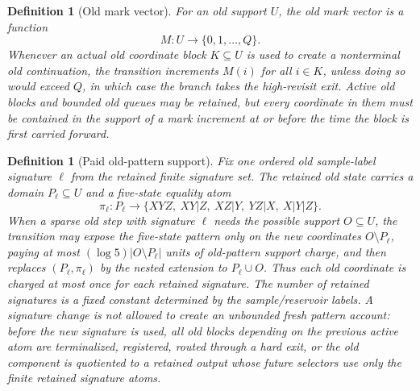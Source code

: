 \documentclass[11pt]{article}
\newtheorem{definition}[theorem]{Definition}
\theoremstyle{remark}
\begin{document}
\begin{definition}[Old mark vector]
For an old support $U$, the old mark vector is a function
\[
        M:U\to\{0,1,\ldots,Q\}.
\]
Whenever an actual old coordinate block $K\subseteq U$ is used to create a nonterminal old continuation, the transition increments $M(i)$ for all $i\in K$, unless doing so would exceed $Q$, in which case the branch takes the high-revisit exit.  Active old blocks and bounded old queues may be retained, but every coordinate in them must be contained in the support of a mark increment at or before the time the block is first carried forward.
\end{definition}

\begin{definition}[Paid old-pattern support]\label{def:paid-old-pattern}
Fix one ordered old sample-label signature $\ell$ from the retained finite signature set.  The retained old state carries a domain $P_\ell\subseteq U$ and a five-state equality atom
\[
        \pi_\ell:P_\ell\to
        \{XYZ,\ XY|Z,\ XZ|Y,\ YZ|X,\ X|Y|Z\}.
\]
When a sparse old step with signature $\ell$ needs the possible support $O\subseteq U$, the transition may expose the five-state pattern only on the new coordinates $O\setminus P_\ell$, paying at most $(\log 5)|O\setminus P_\ell|$ units of old-pattern support charge, and then replaces $(P_\ell,\pi_\ell)$ by the nested extension to $P_\ell\cup O$.  Thus each old coordinate is charged at most once for each retained signature.  The number of retained signatures is a fixed constant determined by the sample/reservoir labels.  A signature change is not allowed to create an unbounded fresh pattern account: before the new signature is used, all old blocks depending on the previous active atom are terminalized, registered, routed through a hard exit, or the old component is quotiented to a retained output whose future selectors use only the finite retained signature atoms.
\end{definition}
\end{document}
